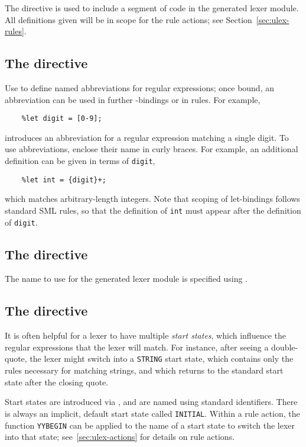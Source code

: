 The  directive is used to include a segment of code in the generated lexer module.  All definitions given will be in scope for the rule actions; see Section~\ref{sec:ulex-rules}.

\subsection{The  directive}

Use  to define named abbreviations for regular expressions; once bound, an abbreviation can be used in further -bindings or in rules.  For example,
\begin{verbatim}
    %let digit = [0-9];
\end{verbatim}
introduces an abbreviation for a regular expression matching a single digit.  To use abbreviations, enclose their name in curly braces.  For example, an additional  definition can be given in terms of \texttt{digit},
\begin{verbatim}
    %let int = {digit}+;
\end{verbatim}
which matches arbitrary-length integers.  Note that scoping of let-bindings follows standard SML rules, so that the definition of \texttt{int} must appear after the definition of \texttt{digit}.

\subsection{The  directive}

The name to use for the generated lexer module is specified using .

\subsection{The  directive}

It is often helpful for a lexer to have multiple \emph{start states}, which influence the regular expressions that the lexer will match.  For instance, after seeing a double-quote, the lexer might switch into a \texttt{STRING} start state, which contains only the rules necessary for matching strings, and which returns to the standard start state after the closing quote.

Start states are introduced via , and are named using standard identifiers.  There is always an implicit, default start state called \texttt{INITIAL}.  Within a rule action, the function \texttt{YYBEGIN} can be applied to the name of a start state to switch the lexer into that state; see~\ref{sec:ulex-actions} for details on rule actions.

